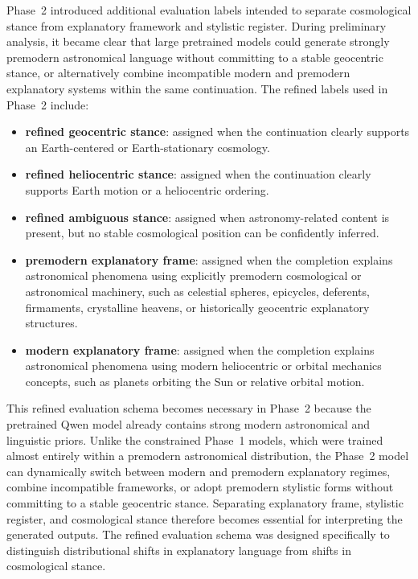Phase~2 introduced additional evaluation labels intended to separate cosmological stance from explanatory framework and stylistic register. During preliminary analysis, it became clear that large pretrained models could generate strongly premodern astronomical language without committing to a stable geocentric stance, or alternatively combine incompatible modern and premodern explanatory systems within the same continuation. The refined labels used in Phase~2 include:

\begin{itemize}

\item \textbf{refined geocentric stance}: 
assigned when the continuation clearly supports an Earth-centered or Earth-stationary cosmology.

\item \textbf{refined heliocentric stance}: 
assigned when the continuation clearly supports Earth motion or a heliocentric ordering.

\item \textbf{refined ambiguous stance}: 
assigned when astronomy-related content is present, but no stable cosmological position can be confidently inferred.

\item \textbf{premodern explanatory frame}:
assigned when the completion explains astronomical phenomena using explicitly premodern cosmological or astronomical machinery, such as celestial spheres, epicycles, deferents, firmaments, crystalline heavens, or historically geocentric explanatory structures.

\item \textbf{modern explanatory frame}: 
assigned when the completion explains astronomical phenomena using modern heliocentric or orbital mechanics concepts, such as planets orbiting the Sun or relative orbital motion.

\end{itemize}

This refined evaluation schema becomes necessary in Phase~2 because the pretrained Qwen model already contains strong modern astronomical and linguistic priors. Unlike the constrained Phase~1 models, which were trained almost entirely within a premodern astronomical distribution, the Phase~2 model can dynamically switch between modern and premodern explanatory regimes, combine incompatible frameworks, or adopt premodern stylistic forms without committing to a stable geocentric stance. Separating explanatory frame, stylistic register, and cosmological stance therefore becomes essential for interpreting the generated outputs. The refined evaluation schema was designed specifically to distinguish distributional shifts in explanatory language from shifts in cosmological stance. 

